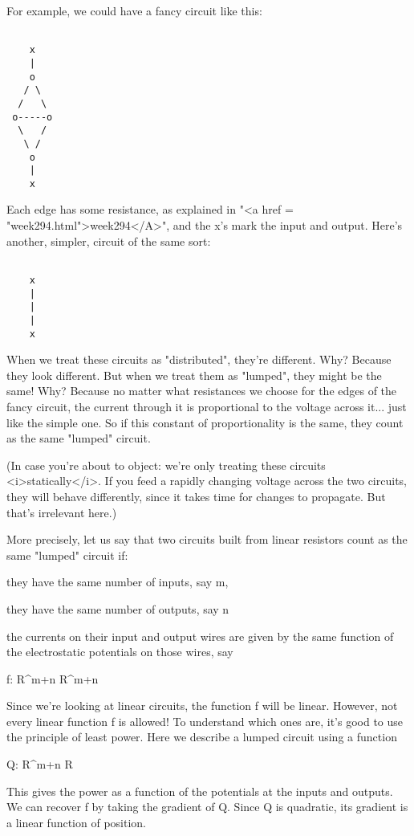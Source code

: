 For example, we could have a fancy circuit like this:


\begin{verbatim}

    x
    |
    o
   / \
  /   \
 o-----o
  \   /
   \ /
    o
    |
    x
\end{verbatim}
    

Each edge has some resistance, as explained in "<a href =
"week294.html">week294</A>", and the x's mark the input and
output.  Here's another, simpler, circuit of the same sort:


\begin{verbatim}

    x
    |
    |
    |
    x
\end{verbatim}
    

When we treat these circuits as "distributed", they're different.
Why?  Because they look different.  But when we treat them as
"lumped", they might be the same!  Why?  Because no matter what
resistances we choose for the edges of the fancy circuit, the current
through it is proportional to the voltage across it... just like the
simple one.  So if this constant of proportionality is the same, they
count as the same "lumped" circuit.

(In case you're about to object: we're only treating these circuits
<i>statically</i>.  If you feed a rapidly changing voltage across the two
circuits, they will behave differently, since it takes time for
changes to propagate.  But that's irrelevant here.)

More precisely, let us say that two circuits built from linear
resistors count as the same "lumped" circuit if:

   they have the same number of inputs, say m,

   they have the same number of outputs, say n

   the currents on their input and output wires are given by the 
   same function of the electrostatic potentials on those wires,
   say

   f: R^{m+n}  \to  R^{m+n}

Since we're looking at linear circuits, the function f will be linear.
However, not every linear function f is allowed!  To understand which
ones are, it's good to use the principle of least power.  Here we 
describe a lumped circuit using a function

Q: R^{m+n} \to  R 

This gives the power as a function of the potentials at the inputs and
outputs.  We can recover f by taking the gradient of Q.  Since Q is
quadratic, its gradient is a linear function of position.

